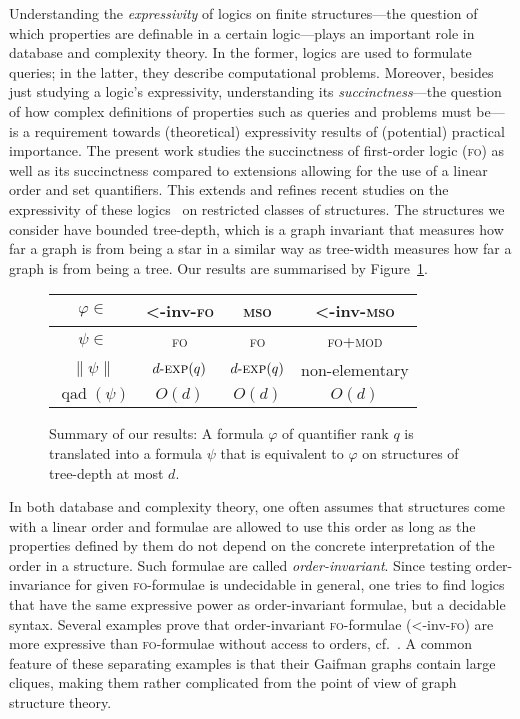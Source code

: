 \documentclass[11pt]{article}
\renewcommand{\phi}{\varphi}
\newcommand{\logic}[1]{\textsc{#1}}
\newcommand{\FO}{\logic{fo}}
\newcommand{\FOmod}{\logic{fo+mod}}
\newcommand{\MSO}{\logic{mso}}
\newcommand{\ordinv}[1]{\textnormal{{\small \textless}-inv-}#1}
\newcommand{\oiFO}{\ordinv{\FO{}}}
\newcommand{\oiMSO}{\ordinv{\MSO{}}}
\newcommand{\size}[1]{\|#1\|}
\newcommand{\qad}[1]{\operatorname{qad}(#1)}
\newcommand{\bigo}{O}
\newcommand{\nexp}[1][d]{\ensuremath{#1\textnormal{-}\textsc{exp}}}
\begin{document}
Understanding the \emph{expressivity} of logics on finite structures---the
question of which properties are definable in a certain logic---plays an
important role in database and complexity theory. In the former, logics are used
to formulate queries; in the latter, they describe computational
problems. Moreover, besides just studying a logic's expressivity, understanding
its \emph{succinctness}---the question of how complex definitions of properties
such as queries and problems must be---is a requirement towards (theoretical)
expressivity results of (potential) practical importance. The present work
studies the succinctness of first-order logic (\FO{}) as well as its
succinctness compared to extensions allowing for the use of a linear order and
set quantifiers. This extends and refines recent studies on the expressivity of
these logics~\cite{BenediktSegoufin2009,ElberfeldGT12} on restricted classes of
structures. The structures we consider have bounded tree-depth, which is a graph
invariant that measures how far a graph is from being a star in a similar way as
tree-width measures how far a graph is from being a tree. Our results are
summarised by Figure~\ref{fig:results}.

\begin{figure}[t]
  \begin{center}
    \begin{tabular}{c @{~~~~~~~} c @{~~~~~~~} c @{~~~~~~~} c}
      \toprule
      $\phi \in$
      & \oiFO{} & \MSO{} & \oiMSO
      \\
      \midrule
      $\psi \in$ & \FO{} & \FO{} & \FOmod
      \\
      $\size{\psi}$ & $\nexp[d](q)$ &
      $\nexp[d](q)$ & non-elementary
      \\
      $\qad{\psi}$ & $\bigo(d)$ & $\bigo(d)$ & $\bigo(d)$\\
      \bottomrule
    \end{tabular}
    \end{center}
  \caption{Summary of our results: A formula $\phi$ of quantifier
    rank $q$ is translated into a formula $\psi$ that is equivalent
    to $\phi$ on structures of tree-depth at most $d$.}
  \label{fig:results}
\end{figure}

In both database and complexity theory, one often assumes that structures come
with a linear order and formulae are allowed to use this order as long as the
properties defined by them do not depend on the concrete interpretation of the
order in a structure. Such formulae are called \emph{order-invariant}. Since
testing order-invariance for given \FO{}-formulae is undecidable in general, one
tries to find logics that have the same expressive power as order-invariant
formulae, but a decidable syntax. Several examples prove that order-invariant
\FO{}-formulae (\oiFO{}) are more expressive than \FO{}-formulae without access
to orders, cf.~\cite{Schweikardt2013}.  A common feature of these separating
examples is that their Gaifman graphs contain large cliques, making them rather
complicated from the point of view of graph structure theory. 
\end{document}
